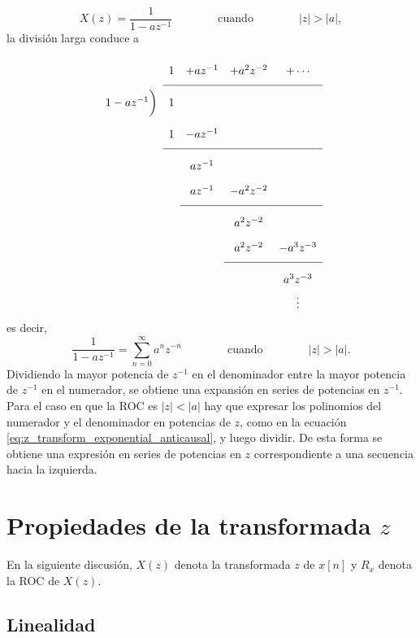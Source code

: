 \documentclass[a4paper]{report}
\begin{document}
\[
 X(z)=\frac{1}{1-az^{-1}}
 \qquad\qquad\textrm{cuando}\qquad\qquad
 |z|>|a|,
\]
la división larga conduce a  
\[
\setlength\extrarowheight{10pt}
\begin{array}[t]{ccccc}
                       & 1 & +az^{-1} & +a^2z^{-2} & +\cdots\\[\medskipamount]
\cline{2-5}
1-az^{-1} 
                \bigg) & 1  &   &  &\\
                       & 1  & -az^{-1} &  & \\[\medskipamount]
\cline{2-5}
                       &    & az^{-1} &   & \\
                       &    & az^{-1} &  -a^2z^{-2} & \\[\medskipamount]
\cline{3-5}
                       &    &         &  a^2z^{-2} & \\
                       &    &         &  a^2z^{-2} & -a^3z^{-3} \\[\medskipamount]
\cline{4-5}
                       &    &                  &   & a^3z^{-3}\\
                       &    &                  &   & \vdots\\
\end{array}
\] 
es decir,
\[
 \frac{1}{1-az^{-1}}=\sum_{n=0}^\infty a^nz^{-n}
 \qquad\qquad\textrm{cuando}\qquad\qquad
 |z|>|a|.
\]
Dividiendo la mayor potencia de \(z^{-1}\) en el denominador entre la mayor potencia de \(z^{-1}\) en el numerador, se obtiene una expansión en series de potencias en \(z^{-1}\). Para el caso en que la ROC es \(|z|<|a|\) hay que expresar los polinomios del numerador y el denominador en potencias de \(z\), como en la ecuación \ref{eq:z_transform_exponential_anticausal}, y luego dividir. De esta forma se obtiene una expresión en series de potencias en \(z\) correspondiente a una secuencia hacia la izquierda.

\section{Propiedades de la transformada \texorpdfstring{\(z\)}{z}}\label{sec:z_transform_properties}
 
En la siguiente discusión, \(X(z)\) denota la transformada \(z\) de \(x[n]\) y \(R_x\) denota la ROC de \(X(z)\).

\subsection{Linealidad} 
 
\end{document}
